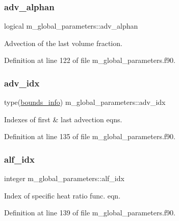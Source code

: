 \subsubsection{\texorpdfstring{adv\+\_\+alphan}{adv\_alphan}}
{\footnotesize\ttfamily logical m\+\_\+global\+\_\+parameters\+::adv\+\_\+alphan}



Advection of the last volume fraction. 



Definition at line 122 of file m\+\_\+global\+\_\+parameters.\+f90.

\mbox{\label{namespacem__global__parameters_ae8e6c40b6ec73cb126b0cce7496e0057}} 
\subsubsection{\texorpdfstring{adv\+\_\+idx}{adv\_idx}}
{\footnotesize\ttfamily type(\hyperlink{structm__derived__types_1_1bounds__info}{bounds\+\_\+info}) m\+\_\+global\+\_\+parameters\+::adv\+\_\+idx}



Indexes of first \& last advection eqns. 



Definition at line 135 of file m\+\_\+global\+\_\+parameters.\+f90.

\mbox{\label{namespacem__global__parameters_af451fa7762c859ef20552498fa6edb16}} 
\subsubsection{\texorpdfstring{alf\+\_\+idx}{alf\_idx}}
{\footnotesize\ttfamily integer m\+\_\+global\+\_\+parameters\+::alf\+\_\+idx}



Index of specific heat ratio func. eqn. 



Definition at line 139 of file m\+\_\+global\+\_\+parameters.\+f90.

